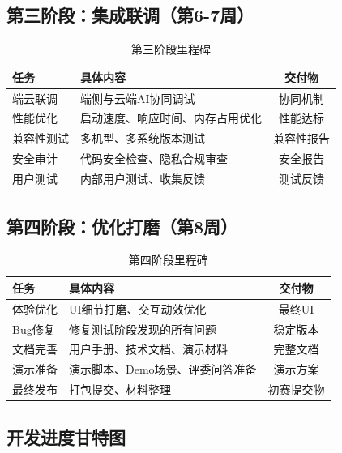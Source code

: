 \documentclass[a4paper,12pt]{ctexart}
\begin{document}
\subsection{第三阶段：集成联调（第6-7周）}

\begin{table}[H]
    \centering
    \caption{第三阶段里程碑}
    \begin{tabularx}{\textwidth}{|l|X|c|}
        \hline
        \textbf{任务} & \textbf{具体内容} & \textbf{交付物} \\
        \hline
        端云联调 & 端侧与云端AI协同调试 & 协同机制 \\
        \hline
        性能优化 & 启动速度、响应时间、内存占用优化 & 性能达标 \\
        \hline
        兼容性测试 & 多机型、多系统版本测试 & 兼容性报告 \\
        \hline
        安全审计 & 代码安全检查、隐私合规审查 & 安全报告 \\
        \hline
        用户测试 & 内部用户测试、收集反馈 & 测试反馈 \\
        \hline
    \end{tabularx}
\end{table}

\subsection{第四阶段：优化打磨（第8周）}

\begin{table}[H]
    \centering
    \caption{第四阶段里程碑}
    \begin{tabularx}{\textwidth}{|l|X|c|}
        \hline
        \textbf{任务} & \textbf{具体内容} & \textbf{交付物} \\
        \hline
        体验优化 & UI细节打磨、交互动效优化 & 最终UI \\
        \hline
        Bug修复 & 修复测试阶段发现的所有问题 & 稳定版本 \\
        \hline
        文档完善 & 用户手册、技术文档、演示材料 & 完整文档 \\
        \hline
        演示准备 & 演示脚本、Demo场景、评委问答准备 & 演示方案 \\
        \hline
        最终发布 & 打包提交、材料整理 & 初赛提交物 \\
        \hline
    \end{tabularx}
\end{table}

\subsection{开发进度甘特图}
\end{document}
